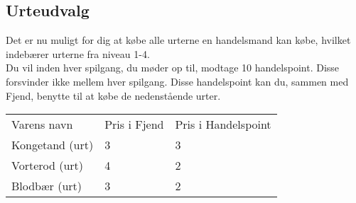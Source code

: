 \subsection*{Urteudvalg}
Det er nu muligt for dig at købe alle urterne en handelsmand kan købe, hvilket indebærer urterne fra niveau 1-4.\\
Du vil inden hver spilgang, du møder op til, modtage 10 handelspoint. Disse forsvinder ikke mellem hver spilgang. Disse handelspoint kan du, sammen med Fjend, benytte til at købe de nedenstående urter.

\begin{table}[H]
    \centering
    \begin{tabular}{|p{}|p{}|p{}|}
    \hline
    \rowcolor{cerulean!80}
    \multicolumn{3}{c}{Urter fra Niv. 1}\\
    \hline
    \rowcolor{cerulean!40}
         Varens navn & Pris i Fjend & Pris i Handelspoint \\\hline
         Kongetand (urt) & 3 & 3\\\hline
         Vorterod (urt) & 4 & 2\\\hline
         Blodbær (urt) & 3 & 2\\\hline
    \end{tabular}
    \end{table}
